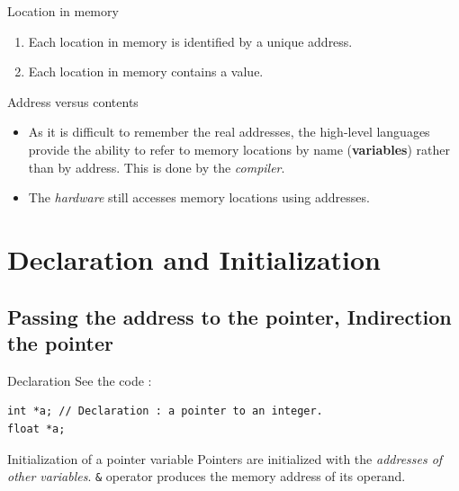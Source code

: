 \begin{Prop}{Location in memory}{}

  \begin{enumerate}

      \item Each location in memory is identified by a unique address. 
      \item Each location in memory contains a value.

  \end{enumerate}
\end{Prop}

\begin{Prop}{Address versus contents}{}
  \begin{itemize}

      \item As it is difficult to remember the real addresses, the high-level languages provide the ability to refer to memory locations by name (\textbf{variables}) rather than by address. This is done by the \textit{compiler}.

      \item The \textit{hardware} still accesses memory locations using addresses.

  \end{itemize}
\end{Prop}




\section{Declaration and Initialization} %
\label{sec:Declaration and Initialization}



\subsection{Passing the address to the pointer, Indirection the pointer} %
\label{sub:Declaring Pointers}

\begin{Prop}{Declaration}{}
See the code :
\begin{lstlisting}
int *a; // Declaration : a pointer to an integer.
float *a;
\end{lstlisting}
\end{Prop}
\begin{Prop}{Initialization of a pointer variable}{}
Pointers are initialized with the \textit{addresses of other variables}.  \verb|&| operator produces the memory address of its operand.

\end{Prop}

